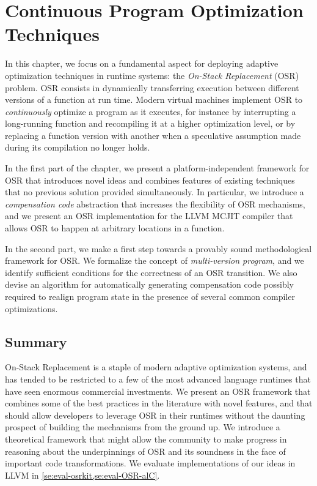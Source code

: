 
\chapter{Continuous Program Optimization Techniques}
\label{ch:continuous}

In this chapter, we focus on a fundamental aspect for deploying adaptive optimization techniques in runtime systems: the {\em On-Stack Replacement} (OSR) problem. OSR consists in dynamically transferring execution between different versions of a function at run time. Modern virtual machines implement OSR to {\em continuously} optimize a program as it executes, for instance by interrupting a long-running function and recompiling it at a higher optimization level, or by replacing a function version with another when a speculative assumption made during its compilation no longer holds.

In the first part of the chapter, we present a platform-independent framework for OSR that introduces novel ideas and combines features of existing techniques that no previous solution provided simultaneously. In particular, we introduce a {\em compensation code} abstraction that increases the flexibility of OSR mechanisms, and we present an OSR implementation for the LLVM MCJIT compiler that allows OSR to happen at arbitrary locations in a function.

In the second part, we make a first step towards a provably sound methodological framework for OSR. We formalize the concept of {\em multi-version program}, and we identify sufficient conditions for the correctness of an OSR transition. We also devise an algorithm for automatically generating compensation code possibly required to realign program state in the presence of several common compiler optimizations.




\section{Summary}
On-Stack Replacement is a staple of modern adaptive optimization systems, and has tended to be restricted to a few of the most advanced language runtimes that have seen enormous commercial investments. We present an OSR framework that combines some of the best practices in the literature with novel features, and that should allow developers to leverage OSR in their runtimes without the daunting prospect of building the mechanisms from the ground up. We introduce a theoretical framework that might allow the community to make progress in reasoning about the underpinnings of OSR and its soundness in the face of important code transformations. We evaluate implementations of our ideas in LLVM in \mysection\ref{se:eval-osrkit,se:eval-OSR-alC}.